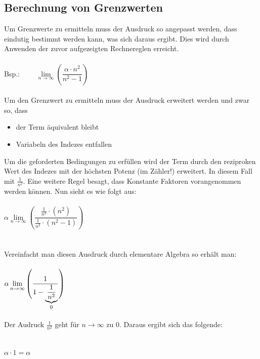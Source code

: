 \subsection{Berechnung von Grenzwerten}
Um Grenzwerte zu ermitteln muss der Ausdruck so angepasst werden, dass eindutig bestimmt werden kann, was sich daraus ergibt.
Dies wird durch Anwenden der zuvor aufgezeigten Rechnereglen erreicht.\\\\
Bsp.: $ \quad \quad \lim\limits_{n \rightarrow \infty} \left( \dfrac{\alpha \cdot n^2}{n^2-1} \right) $ \\\\
Um den Grenzwert zu ermitteln muss der Ausdruck erweitert werden und zwar so, dass
\begin{itemize}
\item der Term äquivalent bleibt
\item Variabeln des Indezes entfallen
\end{itemize}
Um die geforderten Bedingungen zu erfüllen wird der Term durch den reziproken Wert des Indezes mit der höchsten Potenz (im Zähler!) erweitert. In diesem Fall mit $\frac{1}{n^2}$. 
Eine weitere Regel besagt, dass Konstante Faktoren vorangenommen werden können.
Nun sieht es wie folgt aus:\\\\
\indent \indent \indent $ \alpha \lim\limits_{n \rightarrow \infty} 
    \left( \dfrac{\frac{1}{n^2} \cdot (n^2) }{ \frac{1}{n^2} \cdot (n^2 -1) } \right)  $\\\\\\
Vereinfacht man diesen Ausdruck durch elementare Algebra so erhält man: \\\\
\indent \indent \indent $ \alpha \lim\limits_{n \rightarrow \infty} \left( \dfrac{1}{1-
\smash{\underbrace{\frac{1}{n^2}}_0 } \vphantom{\dfrac{1}{n^2}} } \right) $\\\\\\
Der Audruck $\frac{1}{n^2}$ geht für $n \rightarrow \infty$ zu $0$. Daraus ergibt sich das folgende:\\\\\\
\indent \indent \indent $ \alpha \cdot 1 = \alpha $


